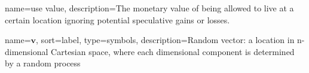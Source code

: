{
name=use value,
description={The monetary value of being allowed to live at a certain location ignoring potential speculative gains or losses. }
}



{
name={$\mathbf{v}$},
sort={label},
type=symbols,
description={Random vector: a location in n-dimensional Cartesian space, where each dimensional component is determined by a random process}
}